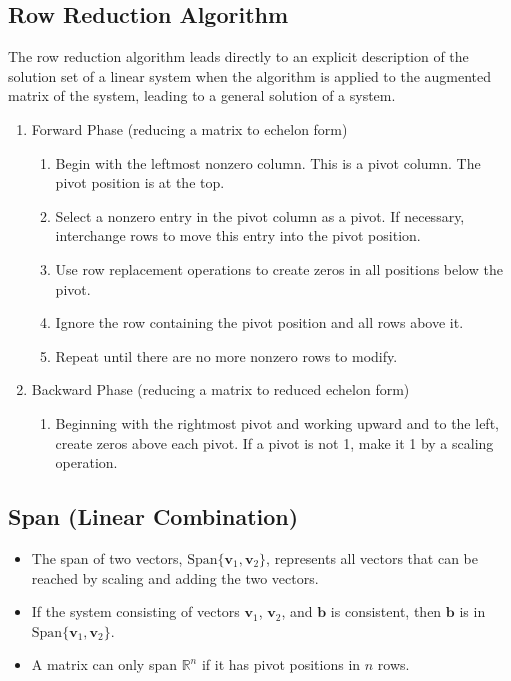 \documentclass{article}
\begin{document}
\subsection*{Row Reduction Algorithm}
The row reduction algorithm leads directly to an explicit description of the solution set of a
linear system when the algorithm is applied to the augmented matrix of the system, leading to a
general solution of a system.
\begin{enumerate}
    \item Forward Phase (reducing a matrix to echelon form)
    \begin{enumerate}
        \item Begin with the leftmost nonzero column. This is a pivot column. The pivot position is
        at the top.
        \item Select a nonzero entry in the pivot column as a pivot. If necessary, interchange rows
        to move this entry into the pivot position.
        \item Use row replacement operations to create zeros in all positions below the pivot.
        \item Ignore the row containing the pivot position and all rows above it.
        \item Repeat until there are no more nonzero rows to modify.
    \end{enumerate}
    \item Backward Phase (reducing a matrix to reduced echelon form)
    \begin{enumerate}
        \item Beginning with the rightmost pivot and working upward and to the left, create zeros
        above each pivot. If a pivot is not 1, make it 1 by a scaling operation.
    \end{enumerate}
\end{enumerate}

\subsection*{Span (Linear Combination)}
\begin{itemize}
    \item The span of two vectors, $\text{Span}\{\mathbf{v}_1, \mathbf{v}_2\}$, represents all
    vectors that can be reached by scaling and adding the two vectors.
    \item If the system consisting of vectors $\mathbf{v}_1$, $\mathbf{v}_2$, and $\mathbf{b}$ is
    consistent, then $\mathbf{b}$ is in $\text{Span}\{\mathbf{v}_1, \mathbf{v}_2\}$.
    \item A matrix can only span $\mathbb{R}^n$ if it has pivot positions in $n$ rows.
\end{itemize}
\end{document}
